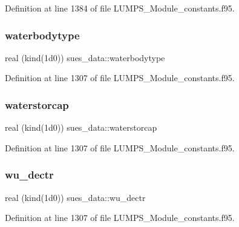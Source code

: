 Definition at line 1384 of file L\+U\+M\+P\+S\+\_\+\+Module\+\_\+constants.\+f95.

\mbox{\label{namespacesues__data_a6433e676b899356c4023713d7a5ab589}} 
\subsubsection{\texorpdfstring{waterbodytype}{waterbodytype}}
{\footnotesize\ttfamily real (kind(1d0)) sues\+\_\+data\+::waterbodytype}



Definition at line 1307 of file L\+U\+M\+P\+S\+\_\+\+Module\+\_\+constants.\+f95.

\mbox{\label{namespacesues__data_adf49f9058cfb8894abba11870ace90bf}} 
\subsubsection{\texorpdfstring{waterstorcap}{waterstorcap}}
{\footnotesize\ttfamily real (kind(1d0)) sues\+\_\+data\+::waterstorcap}



Definition at line 1307 of file L\+U\+M\+P\+S\+\_\+\+Module\+\_\+constants.\+f95.

\mbox{\label{namespacesues__data_a087f298012279c621f24a283b360d592}} 
\subsubsection{\texorpdfstring{wu\+\_\+dectr}{wu\_dectr}}
{\footnotesize\ttfamily real (kind(1d0)) sues\+\_\+data\+::wu\+\_\+dectr}



Definition at line 1307 of file L\+U\+M\+P\+S\+\_\+\+Module\+\_\+constants.\+f95.

\mbox{\label{namespacesues__data_a6aa0ce59c7eee4b94b9ee86ac5b555d0}} 
